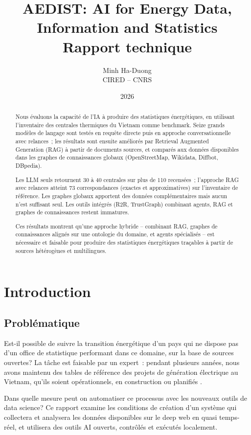 \documentclass[a4paper,11pt]{report}
\title{AEDIST: AI for Energy Data, Information and Statistics\\
\large Rapport technique}
\author{Minh Ha-Duong\\CIRED -- CNRS}
\date{2026}
\begin{document}
\maketitle
\setcounter{tocdepth}{2}
\tableofcontents

\begin{abstract}
Nous évaluons la capacité de l'IA à produire des statistiques énergétiques, en utilisant l'inventaire des centrales thermiques du Vietnam comme benchmark. Seize grands modèles de langage sont testés en requête directe puis en approche conversationnelle avec relances~; les résultats sont ensuite améliorés par Retrieval Augmented Generation (RAG) à partir de documents sources, et comparés aux données disponibles dans les graphes de connaissances globaux (OpenStreetMap, Wikidata, Diffbot, DBpedia).

Les LLM seuls retournent 30 à 40 centrales sur plus de 110 recensées~; l'approche RAG avec relances atteint 73 correspondances (exactes et approximatives) sur l'inventaire de référence. Les graphes globaux apportent des données complémentaires mais aucun n'est suffisant seul. Les outils intégrés (R2R, TrustGraph) combinant agents, RAG et graphes de connaissances restent immatures.

Ces résultats montrent qu'une approche hybride -- combinant RAG, graphes de connaissances alignés sur une ontologie du domaine, et agents spécialisés -- est nécessaire et faisable pour produire des statistiques énergétiques traçables à partir de sources hétérogènes et multilingues.
\end{abstract}

\chapter{Introduction}

\section{Problématique}

Est-il possible de suivre la transition énergétique d'un pays qui ne dispose pas d'un office de statistique performant dans ce domaine, sur la base de sources ouvertes? La tâche est faisable par un expert~: pendant plusieurs années, nous avons maintenu des tables de référence des projets de génération électrique au Vietnam, qu'ils soient opérationnels, en construction ou planifiés \citep{NLN8GPNI}.

Dans quelle mesure peut on automatiser ce processus avec les nouveaux outils de data science?
Ce rapport examine les conditions de création d'un système qui collectera et analysera les données disponibles sur le deep web en quasi temps-réel, et utilisera des outils AI ouverts, contrôlés et exécutés localement.
\end{document}
